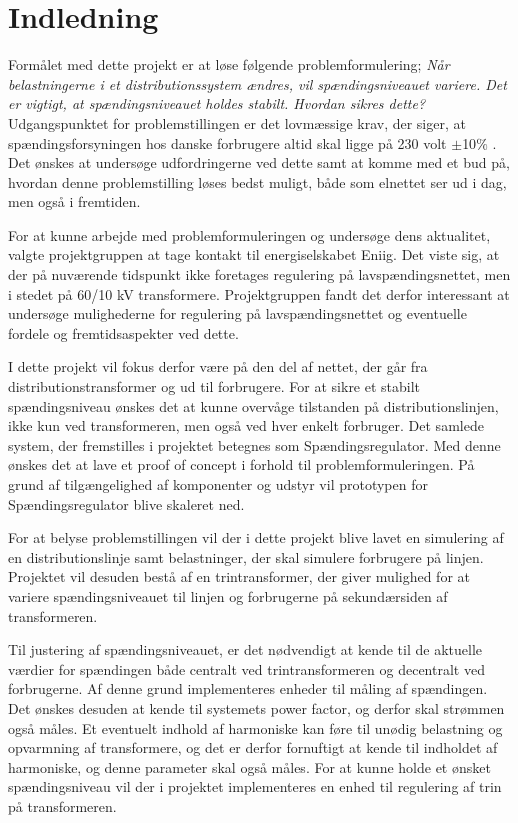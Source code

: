 
\section{Indledning}

Formålet med dette projekt er at løse følgende problemformulering; \textit{Når belastningerne i et distributionssystem ændres, vil spændingsniveauet variere. Det er vigtigt, at spændingsniveauet holdes stabilt. Hvordan sikres dette?}
Udgangspunktet for problemstillingen er det lovmæssige krav, der siger, at spændingsforsyningen hos danske forbrugere altid skal ligge på 230 volt $\pm$10$\%$ \cite{Sikkerhedsstyrelsen}. Det ønskes at undersøge udfordringerne ved dette samt at komme med et bud på, hvordan denne problemstilling løses bedst muligt, både som elnettet ser ud i dag, men også i fremtiden. 

For at kunne arbejde med problemformuleringen og undersøge dens aktualitet, valgte projektgruppen at tage kontakt til energiselskabet Eniig. Det viste sig, at der på nuværende tidspunkt ikke foretages regulering på lavspændingsnettet, men i stedet på 60/10 kV transformere. Projektgruppen fandt det derfor interessant at undersøge mulighederne for regulering på lavspændingsnettet og eventuelle fordele og fremtidsaspekter ved dette.

I dette projekt vil fokus derfor være på den del af nettet, der går fra distributionstransformer og ud til forbrugere. For at sikre et stabilt spændingsniveau ønskes det at kunne overvåge tilstanden på distributionslinjen, ikke kun ved transformeren, men også ved hver enkelt forbruger. Det samlede system, der fremstilles i projektet betegnes som Spændingsregulator. Med denne ønskes det at lave et proof of concept i forhold til problemformuleringen. På grund af tilgængelighed af komponenter og udstyr vil prototypen for Spændingsregulator blive skaleret ned. 

For at belyse problemstillingen vil der i dette projekt blive lavet en simulering af en distributionslinje samt belastninger, der skal simulere forbrugere på linjen. Projektet vil desuden bestå af en trintransformer, der giver mulighed for at variere spændingsniveauet til linjen og forbrugerne på sekundærsiden af transformeren.

Til justering af spændingsniveauet, er det nødvendigt at kende til de aktuelle værdier for spændingen både centralt ved trintransformeren og decentralt ved forbrugerne. Af denne grund implementeres enheder til måling af spændingen. Det ønskes desuden at kende til systemets power factor, og derfor skal strømmen også måles. Et eventuelt indhold af harmoniske kan føre til unødig belastning og opvarmning af transformere, og det er derfor fornuftigt at kende til indholdet af harmoniske, og denne parameter skal også måles.
For at kunne holde et ønsket spændingsniveau vil der i projektet implementeres en enhed til regulering af trin på transformeren.

